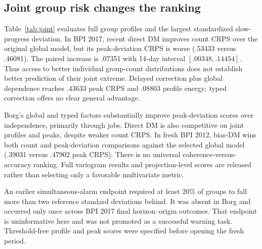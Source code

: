 \subsection{Joint group risk changes the ranking}
Table~\ref{tab:joint} evaluates full group profiles and the largest standardized
slow-progress deviation. In BPI 2017, recent direct DM improves count CRPS
over the original global model, but its peak-deviation CRPS is worse
(.53433 versus .46081). The paired increase is .07351 with 14-day interval
$[.00348,.14454]$. Thus access to better individual group-count distributions
does not establish better prediction of their joint extreme. Delayed
correction plus global dependence reaches .43633 peak CRPS and .08803
profile energy; typed correction offers no clear general advantage.

Borg's global and typed factors substantially improve peak-deviation scores
over independence, primarily through jobs. Direct DM is also competitive
on joint profiles and peaks, despite weaker count CRPS. In fresh BPI 2012,
bias-DM wins both count and peak-deviation comparisons against the selected
global model (.39031 versus .47902 peak CRPS). There is no universal
coherence-versus-accuracy ranking. Full variogram results and projection-level
scores are released rather than selecting only a favorable multivariate metric.

An earlier simultaneous-alarm endpoint required at least 20\% of groups to
fall more than two reference standard deviations behind. It was absent in
Borg and occurred only once across BPI 2017 final horizon--origin outcomes.
That endpoint is uninformative here and was not promoted as a successful
warning task. Threshold-free profile and peak scores were specified before
opening the fresh period.
